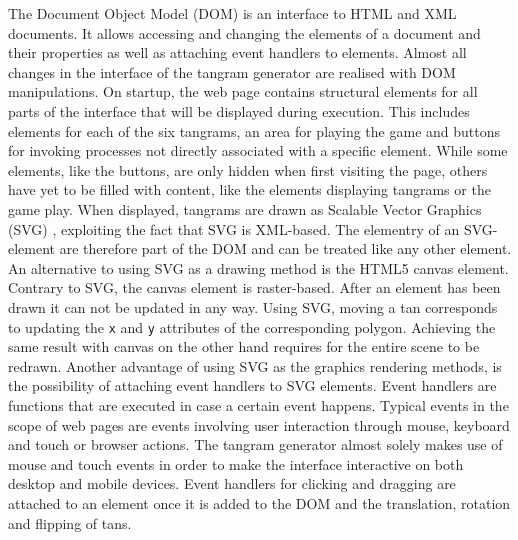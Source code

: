 The Document Object Model (DOM) is an interface to HTML and XML documents. It allows accessing and changing the elements of a document and their properties as well as attaching event handlers to elements. Almost all changes in the interface of the tangram generator are realised with DOM manipulations. On startup, the web page contains structural elements for all parts of the interface that will be displayed during execution. This includes elements for each of the six tangrams, an area for playing the game and buttons for invoking processes not directly associated with a specific element. While some elements, like the buttons, are only hidden when first visiting the page, others have yet to be filled with content, like the elements displaying tangrams or the game play. When displayed, tangrams are drawn as Scalable Vector Graphics (SVG) \cite{w3c11}, exploiting the fact that SVG is XML-based.  The elementry of an SVG-element are therefore part of the DOM and can be treated like any other element. An alternative to using SVG as a drawing method is the HTML5 canvas element. Contrary to SVG, the canvas element is raster-based. After an element has been drawn it can not be updated in any way. Using SVG, moving a tan corresponds to updating the \verb|x| and \verb|y| attributes of the corresponding polygon. Achieving the same result with canvas on the other hand requires for the entire scene to be redrawn.
Another advantage of using SVG as the graphics rendering methods, is the possibility of attaching event handlers to SVG elements. Event handlers are functions that are executed in case a certain event happens. Typical events in the scope of web pages are events involving user interaction through mouse, keyboard and touch or browser actions. The tangram generator almost solely makes use of mouse and touch events in order to make the interface interactive on both desktop and mobile devices. Event handlers for clicking and dragging are attached to an element once it is added to the DOM and the translation, rotation and flipping of tans. 

